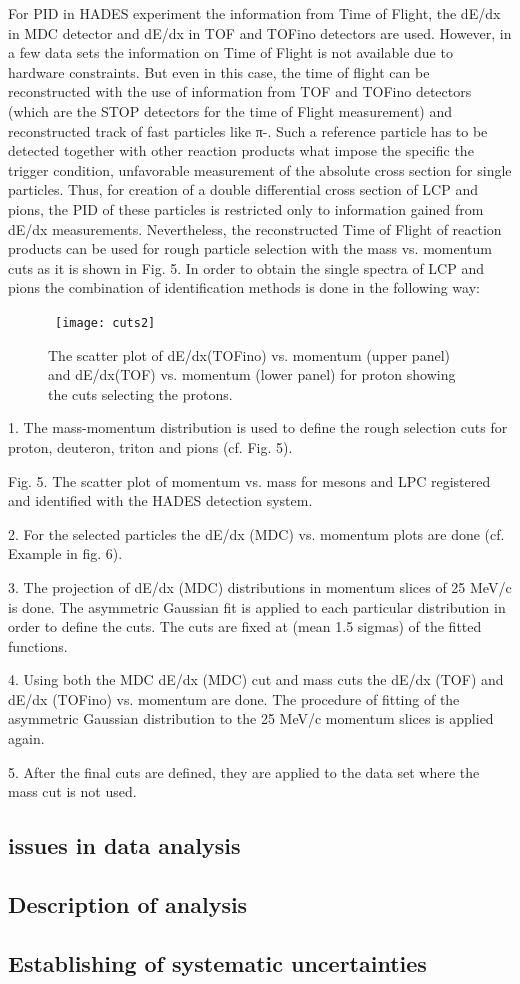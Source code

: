 For PID in HADES experiment the information from Time of Flight, the dE/dx in MDC detector and dE/dx in TOF and TOFino detectors are used. However, in a few data sets the information on Time of Flight is not available due to hardware constraints. But even in this case, the time of flight can be reconstructed with the use of information from TOF and TOFino detectors (which are the STOP detectors for the time of Flight measurement) and reconstructed track of fast particles like π-.  Such a reference particle has to be detected together with other reaction products what impose the specific the trigger condition, unfavorable measurement of the absolute cross section for single particles. Thus, for creation of a double differential cross section of LCP and pions, the PID of these particles is restricted only to information gained from dE/dx measurements. Nevertheless, the reconstructed Time of Flight of reaction products can be used for rough particle selection with the mass vs. momentum cuts as it is shown in Fig. 5.
In order to obtain the single spectra of LCP and pions the combination of identification methods is done in the following way:
\begin{figure}
  \centering\
  \texttt{[image: cuts2]}
  \caption{The scatter plot of dE/dx(TOFino) vs. momentum (upper panel) and dE/dx(TOF) vs. momentum (lower panel) for proton showing the cuts selecting the protons.}
  \label{fig:18OGEMINIS2}
\end{figure}
1. The mass-momentum distribution is used to define the rough selection cuts for proton, deuteron, triton and pions (cf. Fig. 5).

 
 
Fig. 5. The scatter plot of momentum vs. mass for mesons and LPC registered and identified with the HADES detection system.
 

2. For the selected particles the dE/dx (MDC) vs. momentum plots are done (cf. Example in fig. 6).

3. The projection of dE/dx (MDC) distributions in momentum slices of 25 MeV/c is done. The asymmetric Gaussian fit is applied to each particular distribution in order to define the cuts. The cuts are fixed at (mean 1.5 sigmas) of the fitted functions.

4. Using both the MDC dE/dx (MDC) cut and mass cuts the dE/dx (TOF) and dE/dx (TOFino) vs. momentum are done. The procedure of fitting of the asymmetric Gaussian distribution to the 25 MeV/c momentum slices is applied again.

5. After the final cuts are defined, they are applied to the data set where the mass cut is not used.


\subsection{issues in data analysis}
\subsection{Description of analysis}
\subsection{Establishing of systematic uncertainties}